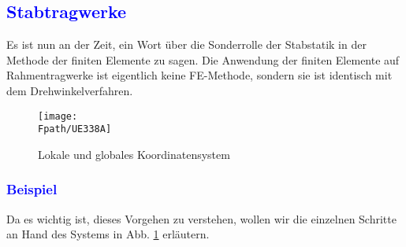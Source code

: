 {\textcolor{blue}{\section{Stabtragwerke}}}

Es ist nun an der Zeit, ein Wort \"{u}ber die Sonderrolle der Stabstatik in der Methode der finiten Elemente zu sagen.
Die Anwendung der finiten Elemente auf Rahmentragwerke ist eigentlich keine FE-Methode, sondern sie ist identisch mit dem Drehwinkelverfahren.


\begin{figure}[tbp]
\centering
\if {} \sidecaption \fi
\texttt{[image: \\Fpath/UE338A]}
\caption{Lokale und globales Koordinatensystem} \label{UE338}
\end{figure}%

{\textcolor{blue}{\subsubsection*{Beispiel}}}
Da es wichtig ist, dieses Vorgehen zu verstehen, wollen wir die einzelnen Schritte an Hand des Systems in Abb.  \ref{UE338} erl\"{a}utern.

